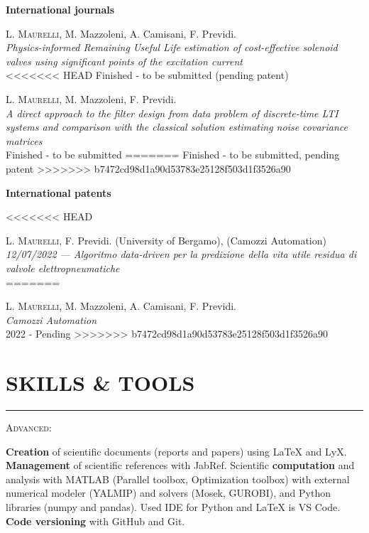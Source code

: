 \documentclass[10pt]{article}
\newcommand{\cvsection}[1]{\section*{\centering\normalsize\uppercase{#1}}\vspace{-16pt}\rule{\linewidth}{0.2pt}\vspace{6pt}}
\begin{document}
\textbf{International journals}
\begin{enumerate}[label={[J0{\arabic*}]}]
	\setlength\itemsep{-3pt}
	\item \label{j2022}\textsc{L. Maurelli}, M. Mazzoleni, A. Camisani, F. Previdi.\\
	\textit{Physics-informed Remaining Useful Life estimation of cost-effective solenoid
	valves using significant points of the excitation current}\\
<<<<<<< HEAD
	Finished - to be submitted (pending patent)
	\item \label{j02}\textsc{L. Maurelli}, M. Mazzoleni, F. Previdi.\\
	\textit{A direct approach to the filter design from data problem of
	discrete-time LTI systems and comparison with the classical
	solution estimating noise covariance matrices}\\
	Finished - to be submitted
=======
	Finished - to be submitted, pending patent
>>>>>>> b7472cd98d1a90d53783e25128f503d1f3526a90
\end{enumerate}
\textbf{International patents}
\begin{enumerate}[label={[P0{\arabic*}]}]
	\setlength\itemsep{-3pt}
<<<<<<< HEAD
	\item \label{p2022}\textsc{L. Maurelli}, F. Previdi. (University of Bergamo), (Camozzi Automation)\\
	\textit{12/07/2022 --- Algoritmo data-driven per la predizione della vita utile
	residua di valvole elettropneumatiche}\\
=======
	\item \label{p2022}\textsc{L. Maurelli}, M. Mazzoleni, A. Camisani, F. Previdi.\\
	\textit{Camozzi Automation}\\
	2022 - Pending
>>>>>>> b7472cd98d1a90d53783e25128f503d1f3526a90
\end{enumerate}
\clearpage

\cvsection{Skills \& Tools}
{\textsc{Advanced:}\par}
\textbf{Creation} of scientific documents (reports and papers) using LaTeX and LyX. \textbf{Management} of scientific references with JabRef.
Scientific \textbf{computation} and analysis with MATLAB (Parallel toolbox, Optimization toolbox) with external numerical modeler (YALMIP) and solvers (Mosek, GUROBI), and Python libraries (numpy and pandas).
Used IDE for Python and LaTeX is VS Code. \textbf{Code versioning} with GitHub and Git.
\end{document}
